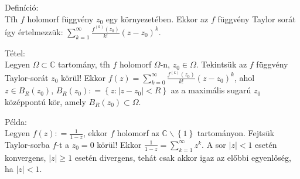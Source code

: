 \documentclass[12pt,a4paper]{scrartcl}
\newenvironment{definicio}{}{}
\newenvironment{tetel}{}{}
\newenvironment{pelda}{}{}
\begin{document}
\begin{definicio}

Definíció:\\
Tfh \(f\) holomorf függvény \(z_{0}\) egy környezetében. Ekkor az \(f\)
függvény Taylor sorát így értelmezzük:
\(\sum\limits_{k = 1}^{\infty}{\frac{f^{(k)}\left( z_{0} \right)}{k!}\left( {z - z_{0}} \right)^{k}}\).

\end{definicio}

\begin{tetel}

Tétel:\\
Legyen \(\Omega \subset {\mathbb{C}}\) tartomány, tfh \(f\) holomorf
\(\Omega\)-n, \(z_{0} \in \Omega\). Tekintsük az \(f\) függvény
Taylor-sorát \(z_{0}\) körül! Ekkor
\(f\left( z \right) = {\sum\limits_{k = 0}^{\infty}{\frac{f^{(k)}\left( z_{0} \right)}{k!}\left( {z - z_{0}} \right)^{k}}}\),
ahol \(z \in B_{R}\left( z_{0} \right)\),
\(B_{R}\left( z_{0} \right): = \left\{ {z:\left| {z - z_{0}} \right| < R} \right\}\)
az a maximális sugarú \(z_{0}\) középpontú kör, amely
\(B_{R}\left( z_{0} \right) \subset \Omega\).

\end{tetel}

\begin{pelda}

Példa:\\
Legyen \(f\left( z \right): = \frac{1}{1 - z}\), ekkor \(f\) holomorf az
\({\mathbb{C}}\backslash\left\{ 1 \right\}\) tartományon. Fejtsük
Taylor-sorba \(f\)-t a \(z_{0} = 0\) körül! Ekkor
\(\frac{1}{1 - z} = {\sum\limits_{k = 1}^{\infty}z^{k}}\). A sor
\(\left| z \right| < 1\) esetén konvergens, \(\left| z \right| \geq 1\)
esetén divergens, tehát csak akkor igaz az előbbi egyenlőség, ha
\(\left| z \right| < 1\).

\end{pelda}
\end{document}
